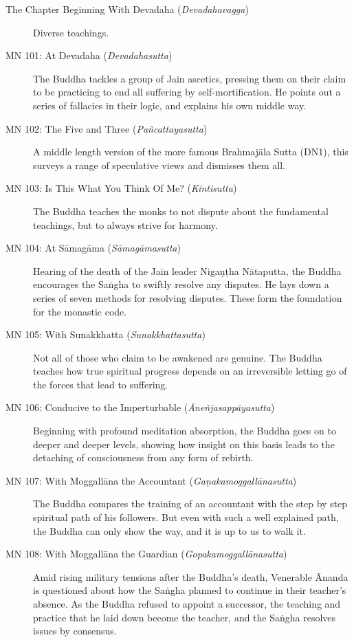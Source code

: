 \documentclass[12pt,openany]{book}%
\begin{document}
\begin{description}%
\item[The Chapter Beginning With Devadaha (\textit{\textsanskrit{Devadahavagga}})] Diverse teachings.%
\item[MN 101: At Devadaha (\textit{\textsanskrit{Devadahasutta}})] The Buddha tackles a group of Jain ascetics, pressing them on their claim to be practicing to end all suffering by self-mortification. He points out a series of fallacies in their logic, and explains his own middle way.%
\item[MN 102: The Five and Three (\textit{\textsanskrit{Pañcattayasutta}})] A middle length version of the more famous \textsanskrit{Brahmajāla} Sutta (DN1), this surveys a range of speculative views and dismisses them all.%
\item[MN 103: Is This What You Think Of Me? (\textit{\textsanskrit{Kintisutta}})] The Buddha teaches the monks to not dispute about the fundamental teachings, but to always strive for harmony.%
\item[MN 104: At \textsanskrit{Sāmagāma} (\textit{\textsanskrit{Sāmagāmasutta}})] Hearing of the death of the Jain leader \textsanskrit{Nigaṇṭha} \textsanskrit{Nātaputta}, the Buddha encourages the \textsanskrit{Saṅgha} to swiftly resolve any disputes. He lays down a series of seven methods for resolving disputes. These form the foundation for the monastic code.%
\item[MN 105: With Sunakkhatta (\textit{\textsanskrit{Sunakkhattasutta}})] Not all of those who claim to be awakened are genuine. The Buddha teaches how true spiritual progress depends on an irreversible letting go of the forces that lead to suffering.%
\item[MN 106: Conducive to the Imperturbable (\textit{\textsanskrit{Āneñjasappāyasutta}})] Beginning with profound meditation absorption, the Buddha goes on to deeper and deeper levels, showing how insight on this basis leads to the detaching of consciousness from any form of rebirth.%
\item[MN 107: With \textsanskrit{Moggallāna} the Accountant (\textit{\textsanskrit{Gaṇakamoggallānasutta}})] The Buddha compares the training of an accountant with the step by step spiritual path of his followers. But even with such a well explained path, the Buddha can only show the way, and it is up to us to walk it.%
\item[MN 108: With \textsanskrit{Moggallāna} the Guardian (\textit{\textsanskrit{Gopakamoggallānasutta}})] Amid rising military tensions after the Buddha’s death, Venerable Ānanda is questioned about how the \textsanskrit{Saṅgha} planned to continue in their teacher’s absence. As the Buddha refused to appoint a successor, the teaching and practice that he laid down become the teacher, and the \textsanskrit{Saṅgha} resolves issues by consensus.%

\end{description}
\end{document}
